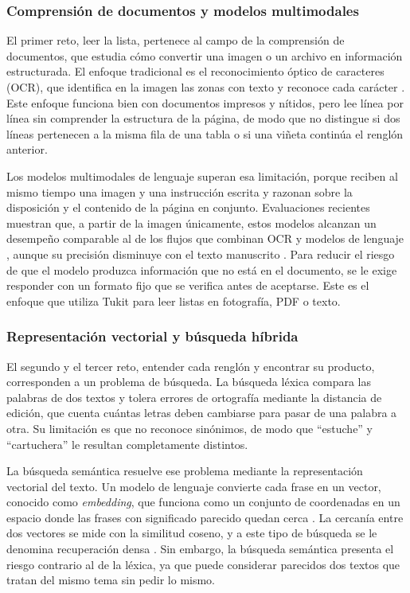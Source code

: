 \subsubsection{Comprensión de documentos y modelos multimodales}

El primer reto, leer la lista, pertenece al campo de la comprensión de documentos, que
estudia cómo convertir una imagen o un archivo en información estructurada. El enfoque
tradicional es el reconocimiento óptico de caracteres (OCR), que identifica en la imagen las
zonas con texto y reconoce cada carácter \citep{smith_overview_2007}. Este enfoque funciona
bien con documentos impresos y nítidos, pero lee línea por línea sin comprender la
estructura de la página, de modo que no distingue si dos líneas pertenecen a la misma fila
de una tabla o si una viñeta continúa el renglón anterior.\par

Los modelos multimodales de lenguaje superan esa limitación, porque reciben al mismo tiempo
una imagen y una instrucción escrita y razonan sobre la disposición y el contenido de la
página en conjunto. Evaluaciones recientes muestran que, a partir de la imagen únicamente,
estos modelos alcanzan un desempeño comparable al de los flujos que combinan OCR y modelos
de lenguaje \citep{shen_ocr_2026}, aunque su precisión disminuye con el texto manuscrito
\citep{liu_ocrbench_2024}. Para reducir el riesgo de que el modelo produzca información que
no está en el documento, se le exige responder con un formato fijo que se verifica antes de
aceptarse. Este es el enfoque que utiliza Tukit para leer listas en fotografía, PDF o
texto.\par

\subsubsection{Representación vectorial y búsqueda híbrida}

El segundo y el tercer reto, entender cada renglón y encontrar su producto, corresponden a un
problema de búsqueda. La búsqueda léxica compara las palabras de dos textos y tolera
errores de ortografía mediante la distancia de edición, que cuenta cuántas letras deben
cambiarse para pasar de una palabra a otra. Su limitación es que no reconoce sinónimos, de
modo que ``estuche'' y ``cartuchera'' le resultan completamente distintos.\par

La búsqueda semántica resuelve ese problema mediante la representación vectorial del texto.
Un modelo de lenguaje convierte cada frase en un vector, conocido como \emph{embedding}, que
funciona como un conjunto de coordenadas en un espacio donde las frases con significado
parecido quedan cerca \citep{reimers_sentence-bert_2019}. La cercanía entre dos vectores se
mide con la similitud coseno, y a este tipo de búsqueda se le denomina recuperación densa
\citep{karpukhin_dense_2020}. Sin embargo, la búsqueda semántica presenta el riesgo
contrario al de la léxica, ya que puede considerar parecidos dos textos que tratan del mismo
tema sin pedir lo mismo.\par

